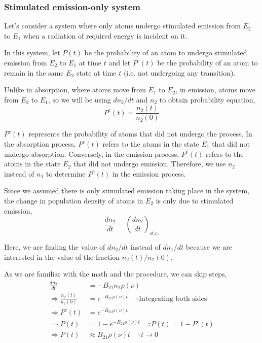 \documentclass[12pt]{article}
\begin{document}
\subsubsection{Stimulated emission-only system}

Let's consider a system where only atoms undergo stimulated emission from $E_{2}$ to $E_{1}$ when a radiation of required energy is incident on it. \vspace{.2cm}

In this system, let $P(t)$ be the probability of an atom to undergo stimulated emission from $E_{2}$ to $E_{1}$ at time $t$ and let $P^c(t)$ be the probability of an atom to remain in the same $E_{2}$ state at time $t$ (i.e. not undergoing any transition). \vspace{.2cm}

Unlike in absorption, where atoms move from $E_{1}$ to $E_{2}$, in emission, atoms move from $E_{2}$ to $E_{1}$, so we will be using $dn_{2}/dt$ and $n_{2}$ to obtain probability equation,
\begin{equation*}
    P^c(t) = \frac{n_{2}(t)}{n_{2}(0)}
\end{equation*}

$P^c(t)$ represents the probability of atoms that did not undergo the process. In the absorption process, $P^c(t)$ refers to the atoms in the state $E_1$ that did not undergo absorption. Conversely, in the emission process, $P^c(t)$ refers to the atoms in the state $E_2$ that did not undergo emission. Therefore, we use $n_2$ instead of $n_1$ to determine $P^c(t)$ in the emission process. \vspace{.2cm}

Since we assumed there is only stimulated emission taking place in the system, the change in population density of atoms in $E_{2}$ is only due to stimulated emission,
\begin{equation*}
    \frac{dn_{2}}{dt} = (\frac{dn_{2}}{dt})_{st.e.}
\end{equation*} \vspace{.1cm}

Here, we are finding the value of $dn_{2}/dt$ instead of $dn_{1}/dt$ because we are interested in the value of the fraction $n_{2}(t)/n_{2}(0)$. \vspace{.2cm}

As we are familiar with the math and the procedure, we can skip steps,
\begin{align*}
    \frac{dn_{2}}{dt} &= -B_{21}n_{2}\rho(\nu) \\
    \Rightarrow \frac{n_2(t)}{n_2(0)} &= e^{-B_{21}\rho(\nu)t} \quad \because \text{Integrating both sides} \\
    \Rightarrow P^c(t) &= e^{-B_{21}\rho(\nu)t} \\
    \Rightarrow P(t) &= 1 - e^{-B_{21}\rho(\nu)t} \quad \because P(t) = 1 - P^c(t) \\
    \Rightarrow P(t) & \approx B_{21}\rho(\nu)t \quad \because t \to 0
\end{align*}
\end{document}
